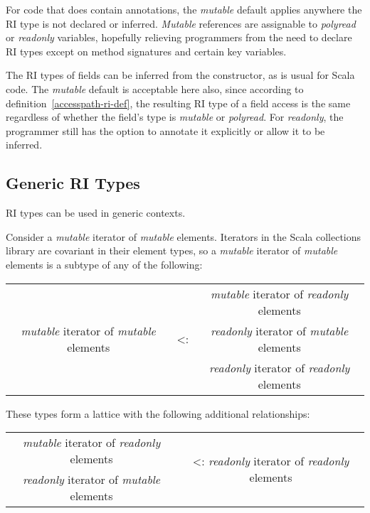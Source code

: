 \documentclass[letterpaper,11pt]{article}
\theoremstyle{definition}
\theoremstyle{remark}
\begin{document}
For code that does contain annotations, the \emph{mutable} default applies
anywhere the RI type is not declared or inferred.
\emph{Mutable} references are assignable to \emph{polyread} or \emph{readonly}
variables, hopefully relieving programmers from the need to declare RI types
except on method signatures and certain key variables.

The RI types of fields can be inferred from the constructor, as is usual
for Scala code.
The \emph{mutable} default is acceptable here also, since according to
definition~\ref{accesspath-ri-def}, the resulting RI type of a field access
is the same regardless of whether the field's type is \emph{mutable} or \emph{polyread}.
For \emph{readonly}, the programmer still has the option to annotate it explicitly
or allow it to be inferred.

\subsection{Generic RI Types}
\label{generic-ri-types}

RI types can be used in generic contexts.

Consider a \emph{mutable} iterator of \emph{mutable} elements.
Iterators in the Scala collections library are covariant in their element types,
so a \emph{mutable} iterator of \emph{mutable} elements
is a subtype of any of the following:

\begin{center}
	\begin{tabular}{ccc}
		& & \emph{mutable} iterator of \emph{readonly} elements \\
	\emph{mutable} iterator of \emph{mutable} elements & <: & \emph{readonly} iterator of \emph{mutable} elements \\
		& & \emph{readonly} iterator of \emph{readonly} elements \\
	\end{tabular}
\end{center}

These types form a lattice with the following additional relationships:

\begin{center}
	\begin{tabular}{cc}
	\emph{mutable} iterator of \emph{readonly} elements &
		\multirow{2}{*}{<: \emph{readonly} iterator of \emph{readonly} elements} \\
	\emph{readonly} iterator of \emph{mutable} elements \\
	\end{tabular}
\end{center}
\end{document}
